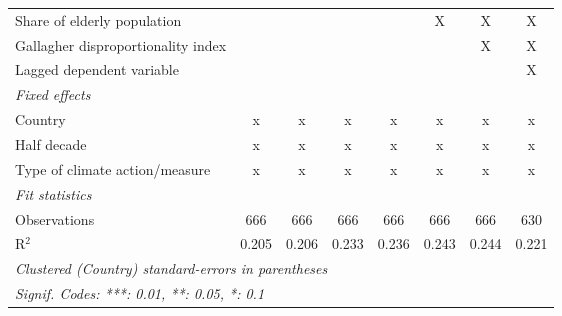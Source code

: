 \begin{tabular}{lccccccc}
   Share of elderly population                                               &              &              &                &                & X              & X              & X\\  
   Gallagher disproportionality index                                        &              &              &                &                &                & X              & X\\  
   Lagged dependent variable                                                 &              &              &                &                &                &                & X\\  
   \emph{Fixed effects}\\
   Country                                                                   & x            & x            & x              & x              & x              & x              & x\\  
   Half decade                                                               & x            & x            & x              & x              & x              & x              & x\\  
   Type of climate action/measure                                            & x            & x            & x              & x              & x              & x              & x\\  
   \midrule \emph{Fit statistics}\\
   Observations                                                              & 666          & 666          & 666            & 666            & 666            & 666            & 630\\  
   R$^2$                                                                     & 0.205        & 0.206        & 0.233          & 0.236          & 0.243          & 0.244          & 0.221\\  
   \midrule
   \multicolumn{8}{l}{\emph{Clustered (Country) standard-errors in parentheses}}\\
   \multicolumn{8}{l}{\emph{Signif. Codes: ***: 0.01, **: 0.05, *: 0.1}}\\
\end{tabular}
\par\endgroup



